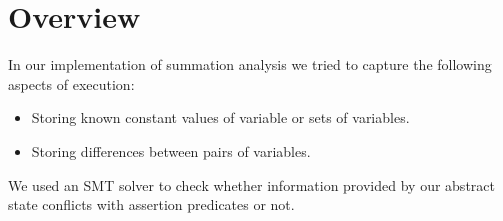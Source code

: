 \section*{Overview}
In our implementation of summation analysis we tried to capture the following aspects of execution:
\begin{itemize}
	\item Storing known constant values of variable or sets of variables.
	\item Storing differences between pairs of variables.
\end{itemize}
We used an SMT solver to check whether information provided by our abstract state conflicts with assertion predicates or not.